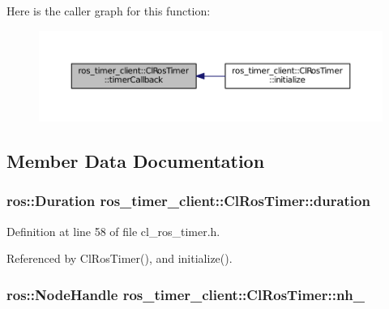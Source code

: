 Here is the caller graph for this function\+:
\nopagebreak
\begin{figure}[H]
\begin{center}
\leavevmode
\includegraphics[width=350pt]{classros__timer__client_1_1ClRosTimer_a185e36ae923a104618300d6b67b6864d_icgraph}
\end{center}
\end{figure}




\subsection{Member Data Documentation}
\subsubsection[{\texorpdfstring{duration}{duration}}]{\setlength{\rightskip}{0pt plus 5cm}ros\+::\+Duration ros\+\_\+timer\+\_\+client\+::\+Cl\+Ros\+Timer\+::duration\hspace{0.3cm}{\ttfamily [protected]}}\hypertarget{classros__timer__client_1_1ClRosTimer_a79df7a52481e520ba959f3e6afb0a817}{}\label{classros__timer__client_1_1ClRosTimer_a79df7a52481e520ba959f3e6afb0a817}


Definition at line 58 of file cl\+\_\+ros\+\_\+timer.\+h.



Referenced by Cl\+Ros\+Timer(), and initialize().

\subsubsection[{\texorpdfstring{nh\+\_\+}{nh_}}]{\setlength{\rightskip}{0pt plus 5cm}ros\+::\+Node\+Handle ros\+\_\+timer\+\_\+client\+::\+Cl\+Ros\+Timer\+::nh\+\_\+\hspace{0.3cm}{\ttfamily [protected]}}\hypertarget{classros__timer__client_1_1ClRosTimer_a3b449cb0a5ee1d02a6bf02edea5371bb}{}\label{classros__timer__client_1_1ClRosTimer_a3b449cb0a5ee1d02a6bf02edea5371bb}


